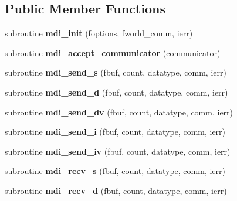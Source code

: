 \subsection*{Public Member Functions}
\begin{DoxyCompactItemize}
\item 
\hypertarget{classmdi_a35894bce734c441b9937f571436443b9}{subroutine {\bfseries mdi\-\_\-init} (foptions, fworld\-\_\-comm, ierr)}\label{classmdi_a35894bce734c441b9937f571436443b9}

\item 
\hypertarget{classmdi_a614089c34c2781079993f86374ee6d93}{subroutine {\bfseries mdi\-\_\-accept\-\_\-communicator} (\hyperlink{structcommunicator__struct}{communicator})}\label{classmdi_a614089c34c2781079993f86374ee6d93}

\item 
\hypertarget{classmdi_aca4f914ed81b61608b82072c034e2990}{subroutine {\bfseries mdi\-\_\-send\-\_\-s} (fbuf, count, datatype, comm, ierr)}\label{classmdi_aca4f914ed81b61608b82072c034e2990}

\item 
\hypertarget{classmdi_aec59c1cdcf1fa6438a2d1d7b87a39b25}{subroutine {\bfseries mdi\-\_\-send\-\_\-d} (fbuf, count, datatype, comm, ierr)}\label{classmdi_aec59c1cdcf1fa6438a2d1d7b87a39b25}

\item 
\hypertarget{classmdi_a53817bdecd52bd0ac15e492050ce7f18}{subroutine {\bfseries mdi\-\_\-send\-\_\-dv} (fbuf, count, datatype, comm, ierr)}\label{classmdi_a53817bdecd52bd0ac15e492050ce7f18}

\item 
\hypertarget{classmdi_ac98e90a334cfdefcd9ef67ec9138b29d}{subroutine {\bfseries mdi\-\_\-send\-\_\-i} (fbuf, count, datatype, comm, ierr)}\label{classmdi_ac98e90a334cfdefcd9ef67ec9138b29d}

\item 
\hypertarget{classmdi_a319b5646a6013e724ec626e0c3a40d4b}{subroutine {\bfseries mdi\-\_\-send\-\_\-iv} (fbuf, count, datatype, comm, ierr)}\label{classmdi_a319b5646a6013e724ec626e0c3a40d4b}

\item 
\hypertarget{classmdi_a9cb1ca30b5286e39ea33f0ce94c41134}{subroutine {\bfseries mdi\-\_\-recv\-\_\-s} (fbuf, count, datatype, comm, ierr)}\label{classmdi_a9cb1ca30b5286e39ea33f0ce94c41134}

\item 
\hypertarget{classmdi_a1f60540c592948d6170a46433402dbdc}{subroutine {\bfseries mdi\-\_\-recv\-\_\-d} (fbuf, count, datatype, comm, ierr)}\label{classmdi_a1f60540c592948d6170a46433402dbdc}


\end{DoxyCompactItemize}
